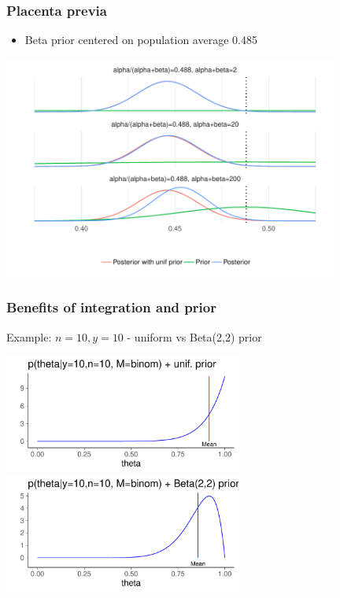 \documentclass[english,t]{beamer}
\begin{document}
\begin{frame}
  \frametitle{Placenta previa}

  \begin{itemize}
  \item Beta prior centered on population average 0.485
  \end{itemize}
  \includegraphics[width=11cm]{figs/demo2_2.pdf}
\end{frame}

\begin{frame}
  \frametitle{Benefits of integration and prior}

  \vspace{-0.5\baselineskip}
  Example: $n=10, y=10$ - uniform vs Beta(2,2) prior
  \begin{center}
  \includegraphics[width=7.8cm]{dbbeta10a.pdf}\\
  \includegraphics[width=7.8cm]{dbbeta10b.pdf}
  \end{center}

\end{frame}
\end{document}
